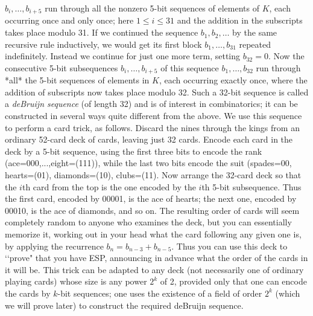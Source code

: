 $b_i,\ldots,b_{i+5}$ run through all the nonzero 5-bit sequences of elements of $K$, each occurring once and only once; here $1\le i\le 31$ and the addition in the subscripts takes place modulo 31.  If we continued the sequence $b_1,b_2,\ldots$ by the same recursive rule inductively, we would get its first block $b_1,\ldots,b_{31}$ repeated indefinitely.  Instead we continue for just one more term, setting $b_{32}= 0$.  Now the consecutive 5-bit subsequences $b_i,\ldots,b_{i+5}$ of this sequence $b_1,\ldots,b_{32}$ run through *all* the 5-bit sequences of elements in $K$, each occurring exactly once, where the addition of subscripts now takes place modulo 32.  Such a 32-bit sequence is called a {\sl deBruijn sequence} (of length 32) and is of interest in combinatorics; it can be constructed in several ways quite different from the above.  We use this sequence to perform a card trick, as follows.  Discard the nines through the kings from an ordinary 52-card deck of cards, leaving just 32 cards.  Encode each card in the deck by a 5-bit sequence, using the first three bits to encode the rank (ace=000,...,eight=(111)), while the last two bits encode the suit (spades=00, hearts=(01), diamonds=(10), clubs=(11).  Now arrange the 32-card deck so that the $i$th card from the top is the one encoded by the $i$th 5-bit subsequence.  Thus the first card, encoded by 00001, is the ace of hearts; the next one, encoded by 00010, is the ace of diamonds, and so on.  The resulting order of cards will seem completely random to anyone who examines the deck, but you can essentially memorize it, working out in your head what the card following any given one is, by applying the recurrence $b_n = b_{n-3} + b_{n-5}$.  Thus you can use this deck to \lq\lq prove" that you have ESP, announcing in advance what the order of the cards in it will be.  This trick can be adapted to any deck (not necessarily one of ordinary playing cards) whose size is any power $2^k$ of 2, provided only that one can encode the cards by $k$-bit sequences; one uses the existence of a field of order $2^k$ (which we will prove later) to construct the required deBruijn sequence.  

